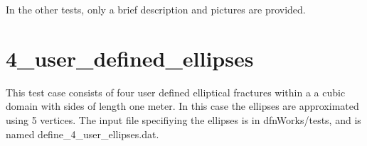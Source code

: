 \documentclass[letterpaper,10pt,english]{sphinxmanual}
\begin{document}
\begin{figure}[htbp]
\centering
\capstart

\noindent{}
\caption{}\label{\detokenize{tutorial:id3}}\end{figure}

In the other tests, only a brief description and pictures are provided.


\section{4\_user\_defined\_ellipses}
\label{\detokenize{tutorial:user-defined-ellipses}}
This test case consists of four user defined elliptical fractures within a a cubic domain with sides of length one meter. In this case the ellipses are approximated using 5 vertices. The input file specifiying the ellipses is in dfnWorks/tests, and is named define\_4\_user\_ellipses.dat.

\begin{figure}[htbp]
\centering

\noindent{}
\end{figure}

\begin{DUlineblock}{0em}
\item[] 
\item[] 
\end{DUlineblock}

\begin{figure}[htbp]
\centering

\noindent{}
\end{figure}

\begin{DUlineblock}{0em}
\item[] 
\item[] 
\end{DUlineblock}

\begin{figure}[htbp]
\centering

\noindent{}
\end{figure}

\begin{DUlineblock}{0em}
\item[] 
\item[] 
\end{DUlineblock}
\end{document}
